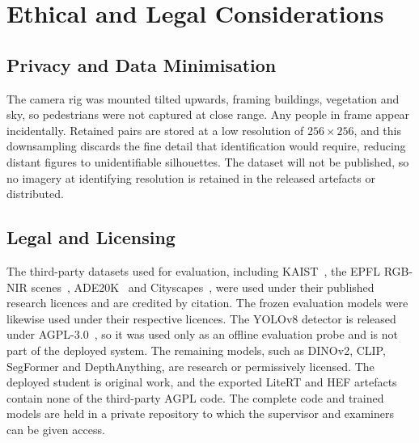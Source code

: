 \doublespacing %

\chapter{Ethical and Legal Considerations}
\label{app:ethics}

\thesisspacing %


\section{Privacy and Data Minimisation}

The camera rig was mounted tilted upwards, framing buildings, vegetation and sky, so pedestrians were not captured at close range. Any people in frame appear incidentally. Retained pairs are stored at a low resolution of $256\times256$, and this downsampling discards the fine detail that identification would require, reducing distant figures to unidentifiable silhouettes. The dataset will not be published, so no imagery at identifying resolution is retained in the released artefacts or distributed.

\section{Legal and Licensing}

The third-party datasets used for evaluation, including KAIST~\cite{hwang2015multispectral}, the EPFL RGB-NIR scenes~\cite{epfl_rgbnir_dataset}, ADE20K~\cite{zhou2017ade20k} and Cityscapes~\cite{cordts2016cityscapes}, were used under their published research licences and are credited by citation. The frozen evaluation models were likewise used under their respective licences. The YOLOv8 detector is released under AGPL-3.0~\cite{jocher2023yolov8}, so it was used only as an offline evaluation probe and is not part of the deployed system. The remaining models, such as DINOv2, CLIP, SegFormer and DepthAnything, are research or permissively licensed. The deployed student is original work, and the exported LiteRT and HEF artefacts contain none of the third-party AGPL code. The complete code and trained models are held in a private repository to which the supervisor and examiners can be given access.







